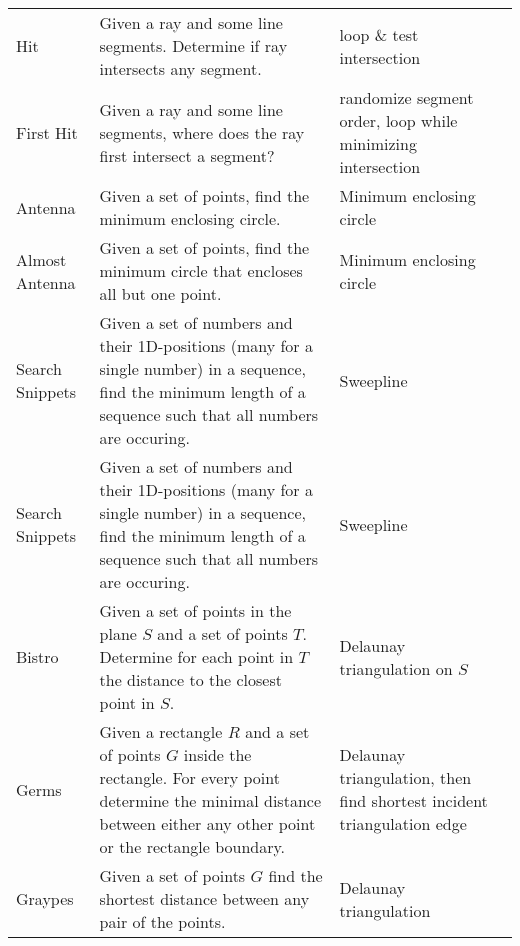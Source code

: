 \documentclass[a4paper, 10pt]{article}
\begin{document}
\begin{longtable}{ L{2cm} L{8cm} L{4cm} r}
        Hit 
        & Given a ray and some line segments. Determine if ray intersects any segment. 
        & loop \& test intersection &  \pageref{sec:hit} \\

        First Hit 
        & Given a ray and some line segments, where does the ray first intersect a segment? 
        & randomize segment order, loop while minimizing intersection &  \pageref{sec:first_hit} \\

        Antenna 
        & Given a set of points, find the minimum enclosing circle. 
        & Minimum enclosing circle &  \pageref{sec:antenna} \\

        Almost Antenna
        & Given a set of points, find the minimum circle that encloses all but one point.
        & Minimum enclosing circle &  \pageref{sec:almost_antenna} \\

        Search Snippets 
        & Given a set of numbers and their 1D-positions (many for a single number) in a sequence, find the minimum length 
            of a sequence such that all numbers are occuring.       
        & Sweepline &  \pageref{sec:search_snippets} \\

        Search Snippets 
        & Given a set of numbers and their 1D-positions (many for a single number) in a sequence, find the minimum length 
            of a sequence such that all numbers are occuring.       
        & Sweepline &  \pageref{sec:search_snippets} \\

        Bistro 
        & Given a set of points in the plane $S$ and a set of points $T$. Determine for each point in $T$ the distance to the closest point in $S$.
        & Delaunay triangulation on $S$ &  \pageref{sec:bistro} \\

        Germs 
        & Given a rectangle $R$ and a set of points $G$ inside the rectangle. For every point determine the minimal distance between either any other 
            point or the rectangle boundary.
        & Delaunay triangulation, then find shortest incident triangulation edge & \pageref{sec:germs} \\

        Graypes 
        & Given a set of points $G$ find the shortest distance between any pair of the points.
        & Delaunay triangulation & \pageref{sec:graypes} \\


\end{longtable}
\end{document}

